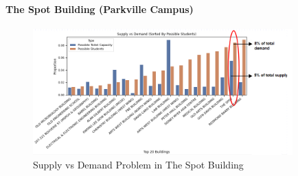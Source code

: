 \paragraph{The Spot Building (Parkville Campus)}
\begin{figure}[H]
\centering
\includegraphics[width=10cm,keepaspectratio=true]{resources/images/spatial-tr/spot.PNG}
\caption{Supply vs Demand Problem in The Spot Building}
\label{fig:spot}
\end{figure}

